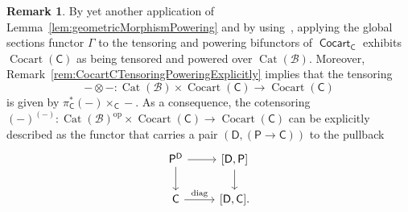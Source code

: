 \documentclass[reqno]{amsart}
\numberwithin{equation}{subsection}
\theoremstyle{plain}
\theoremstyle{definition}
\newtheorem{remark}[equation]{Remark}
\let\scr=\mathcal
\def\BB{\scr B}
\DeclareMathOperator{\Cat}{Cat}
\DeclareMathOperator{\Cocart}{Cocart}
\DeclareMathOperator{\ICocart}{\mathsf{Cocart}}
\DeclareMathOperator{\diag}{diag}
\newcommand{\op}{\mathrm{op}}
\newcommand{\I}[1]{\mathsf{#1}}
\newcommand{\iFun}[2]{{[#1,#2]}}
\begin{document}
\begin{remark}
	\label{rem:CocartCTensoringPoweringSectionwise}
	By yet another application of Lemma~\ref{lem:geometricMorphismPowering} and by using~\cite[Corollary~4.6.8]{Martini2021}, applying the global sections functor $\Gamma$ to the tensoring and powering bifunctors of $\ICocart_{\I{C}}$ exhibits $\Cocart(\I{C})$ as being tensored and powered over $\Cat(\BB)$. Moreover, Remark~\ref{rem:CocartCTensoringPoweringExplicitly} implies that the tensoring
	\begin{equation*}
	-\otimes -\colon \Cat(\BB)\times\Cocart(\I{C})\to\Cocart(\I{C})
	\end{equation*}
	is given by $\pi_{\I{C}}^\ast(-)\times_{\I{C}} -$. As a consequence, the cotensoring $(-)^{(-)}\colon \Cat(\BB)^{\op}\times\Cocart(\I{C})\to\Cocart(\I{C})$ can be explicitly described as the functor that carries a pair $(\I{D},(\I{P}\to\I{C}))$ to the pullback
	\begin{equation*}
	\begin{tikzcd}
	\I{P}^{\I{D}}\arrow[r]\arrow[d] & \iFun{\I{D}}{\I{P}}\arrow[d]\\
	\I{C}\arrow[r, "\diag"] & \iFun{\I{D}}{\I{C}}.
	\end{tikzcd}
	\end{equation*}
\end{remark}
\end{document}
